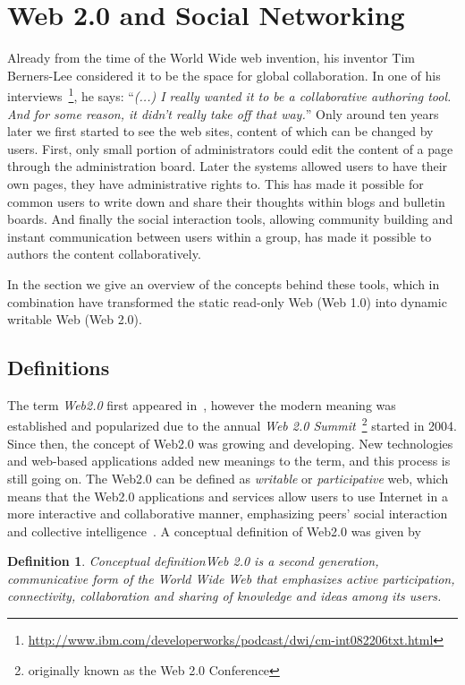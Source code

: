 \documentclass[ngerman,UKenglish,table]{scrbook}
\newtheorem{definition}{Definition}
\begin{document}
\section{Web 2.0 and Social Networking}

Already from the time of the World Wide web invention, his inventor Tim Berners-Lee considered it to be the space for global collaboration.
In one of his interviews~\footnote{\url{http://www.ibm.com/developerworks/podcast/dwi/cm-int082206txt.html}}, he says: ``\emph{(...) I really wanted it to be a collaborative authoring tool. And for some reason, it didn't really take off that way.}''
Only around ten years later we first started to see the web sites, content of which can be changed by users.
First, only small portion of administrators could edit the content of a page through the administration board.
Later the systems allowed users to have their own pages, they have administrative rights to.
This has made it possible for common users to write down and share their thoughts within blogs and bulletin boards.
And finally the social interaction tools, allowing community building and instant communication between users within a group, has made it possible to authors the content collaboratively.

In the section we give an overview of the concepts behind these tools, which in combination have transformed the static read-only Web (Web 1.0) into dynamic writable Web (Web 2.0).

\subsection{Definitions}

The term \emph{Web2.0} first appeared in~\cite{dinucci1999fragmented}, however the modern meaning was established and popularized due to the annual \emph{Web 2.0 Summit}~\footnote{originally known as the Web 2.0 Conference} started in 2004.
Since then, the concept of Web2.0 was growing and developing.
New technologies and web-based applications added new meanings to the term, and this process is still going on.
The Web2.0 can be defined as \emph{writable} or \emph{participative} web, which means that the Web2.0 applications and services allow users to use Internet in a more interactive and collaborative manner, emphasizing peers’ social interaction and collective intelligence~\cite{murugesan2007understanding}.
A conceptual definition of Web2.0 was given by \cite{hall2009towards}
\begin{definition}{Conceptual definition}Web 2.0 is a second generation, communicative form of the World Wide Web that emphasizes active participation, connectivity, collaboration and sharing of knowledge and ideas among its users.
\end{definition}
\end{document}
